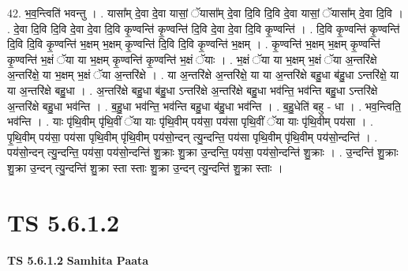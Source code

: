 \documentclass[17pt]{extarticle}
\begin{document}
42. भ॒व॒न्त्विति॑ भवन्तु । . यासा᳚म् दे॒वा दे॒वा यासां॒ ॅयासा᳚म् दे॒वा दि॒वि दि॒वि दे॒वा यासां॒ ॅयासा᳚म् दे॒वा दि॒वि । . दे॒वा दि॒वि दि॒वि दे॒वा दे॒वा दि॒वि कृ॒ण्वन्ति॑ कृ॒ण्वन्ति॑ दि॒वि दे॒वा दे॒वा दि॒वि कृ॒ण्वन्ति॑ । . दि॒वि कृ॒ण्वन्ति॑ कृ॒ण्वन्ति॑ दि॒वि दि॒वि कृ॒ण्वन्ति॑ भ॒क्षम् भ॒क्षम् कृ॒ण्वन्ति॑ दि॒वि दि॒वि कृ॒ण्वन्ति॑ भ॒क्षम् । . कृ॒ण्वन्ति॑ भ॒क्षम् भ॒क्षम् कृ॒ण्वन्ति॑ कृ॒ण्वन्ति॑ भ॒क्षं ॅया या भ॒क्षम् कृ॒ण्वन्ति॑ कृ॒ण्वन्ति॑ भ॒क्षं ॅयाः । . भ॒क्षं ॅया या भ॒क्षम् भ॒क्षं ॅया अ॒न्तरि॑क्षे अ॒न्तरि॑क्षे॒ या भ॒क्षम् भ॒क्षं ॅया अ॒न्तरि॑क्षे । . या अ॒न्तरि॑क्षे अ॒न्तरि॑क्षे॒ या या अ॒न्तरि॑क्षे बहु॒धा ब॑हु॒धा ऽन्तरि॑क्षे॒ या या अ॒न्तरि॑क्षे बहु॒धा । . अ॒न्तरि॑क्षे बहु॒धा ब॑हु॒धा ऽन्तरि॑क्षे अ॒न्तरि॑क्षे बहु॒धा भव॑न्ति॒ भव॑न्ति बहु॒धा ऽन्तरि॑क्षे 
अ॒न्तरि॑क्षे बहु॒धा भव॑न्ति । . ब॒हु॒धा भव॑न्ति॒ भव॑न्ति बहु॒धा ब॑हु॒धा भव॑न्ति । . ब॒हु॒धेति॑ बहु - धा । . भव॒न्त्विति॒ भव॑न्ति । . याः पृ॑थि॒वीम् पृ॑थि॒वीं ॅया याः पृ॑थि॒वीम् पय॑सा॒ पय॑सा पृथि॒वीं ॅया याः पृ॑थि॒वीम् पय॑सा । . पृ॒थि॒वीम् पय॑सा॒ पय॑सा पृथि॒वीम् पृ॑थि॒वीम् पय॑सो॒न्दन् त्यु॒न्दन्ति॒ पय॑सा पृथि॒वीम् पृ॑थि॒वीम् पय॑सो॒न्दन्ति॑ । . पय॑सो॒न्दन् त्यु॒न्दन्ति॒ पय॑सा॒ पय॑सो॒न्दन्ति॑ शु॒क्राः शु॒क्रा उ॒न्दन्ति॒ पय॑सा॒ पय॑सो॒न्दन्ति॑ शु॒क्राः । . उ॒न्दन्ति॑ शु॒क्राः शु॒क्रा उ॒न्दन् त्यु॒न्दन्ति॑ शु॒क्रा स्ता स्ताः शु॒क्रा उ॒न्दन् त्यु॒न्दन्ति॑ शु॒क्रा स्ताः । \newline
\pagebreak
{}

\section{ TS 5.6.1.2 }

\textbf{TS 5.6.1.2 } \newline
\textbf{Samhita Paata} \newline
\end{document}
